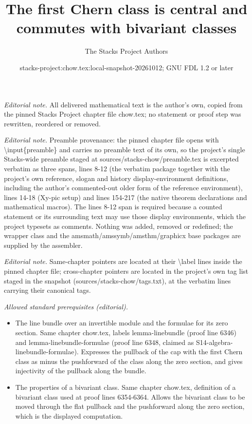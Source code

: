 \documentclass[10pt,a4paper]{amsart}
\title{The first Chern class is central and commutes with bivariant classes}
\author{The Stacks Project Authors}
\date{stacks-project:chow.tex:local-snapshot-20261012; GNU FDL 1.2 or later}
\theoremstyle{plain}
\theoremstyle{definition}
\theoremstyle{remark}
\numberwithin{equation}{subsection}
\begin{document}
\maketitle
\noindent\textit{Editorial note.} All delivered mathematical text is the author's own, copied from the pinned Stacks Project chapter file chow.tex; no statement or proof step was rewritten, reordered or removed.\par\medskip
\noindent\textit{Editorial note.} Preamble provenance: the pinned chapter file opens with \textbackslash{}input\{preamble\} and carries no preamble text of its own, so the project's single Stacks-wide preamble staged at sources/stacks-chow/preamble.tex is excerpted verbatim as three spans, lines 8-12 (the verbatim package together with the project's own reference, slogan and history display-environment definitions, including the author's commented-out older form of the reference environment), lines 14-18 (Xy-pic setup) and lines 154-217 (the native theorem declarations and mathematical macros). The lines 8-12 span is required because a counted statement or its surrounding text may use those display environments, which the project typesets as comments. Nothing was added, removed or redefined; the wrapper class and the amsmath/amssymb/amsthm/graphicx base packages are supplied by the assembler.\par\medskip
\noindent\textit{Editorial note.} Same-chapter pointers are located at their \textbackslash{}label lines inside the pinned chapter file; cross-chapter pointers are located in the project's own tag list staged in the snapshot (sources/stacks-chow/tags.txt), at the verbatim lines carrying their canonical tags.\par\medskip
\noindent\textit{Allowed standard prerequisites (editorial).}\begin{itemize}
\item The line bundle over an invertible module and the formulae for its zero section. Same chapter chow.tex, labels lemma-linebundle (proof line 6346) and lemma-linebundle-formulae (proof line 6348, claimed as S14-algebra-linebundle-formulae). Expresses the pullback of the cap with the first Chern class as minus the pushforward of the class along the zero section, and gives injectivity of the pullback along the bundle.
\item The properties of a bivariant class. Same chapter chow.tex, definition of a bivariant class used at proof lines 6354-6364. Allows the bivariant class to be moved through the flat pullback and the pushforward along the zero section, which is the displayed computation.
\end{itemize}\medskip
\end{document}
